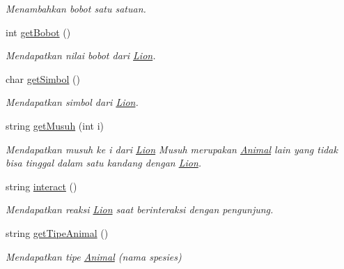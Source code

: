 \begin{DoxyCompactItemize}
\begin{DoxyCompactList}\small\item\em Menambahkan bobot satu satuan. \end{DoxyCompactList}\item 
int \hyperlink{classLion_a039685367875d1cdf4779dce5232edec}{get\-Bobot} ()
\begin{DoxyCompactList}\small\item\em Mendapatkan nilai bobot dari \hyperlink{classLion}{Lion}. \end{DoxyCompactList}\item 
char \hyperlink{classLion_a91396289e60961249390e04bddca1f33}{get\-Simbol} ()
\begin{DoxyCompactList}\small\item\em Mendapatkan simbol dari \hyperlink{classLion}{Lion}. \end{DoxyCompactList}\item 
string \hyperlink{classLion_a6afed6b04ba30683547b43d12db22602}{get\-Musuh} (int i)
\begin{DoxyCompactList}\small\item\em Mendapatkan musuh ke i dari \hyperlink{classLion}{Lion} Musuh merupakan \hyperlink{classAnimal}{Animal} lain yang tidak bisa tinggal dalam satu kandang dengan \hyperlink{classLion}{Lion}. \end{DoxyCompactList}\item 
string \hyperlink{classLion_a5ec3e7aa8b23aabab1c83fdf9e7d0edc}{interact} ()
\begin{DoxyCompactList}\small\item\em Mendapatkan reaksi \hyperlink{classLion}{Lion} saat berinteraksi dengan pengunjung. \end{DoxyCompactList}\item 
string \hyperlink{classLion_ab84e7ce8adc60b918947a03274574274}{get\-Tipe\-Animal} ()
\begin{DoxyCompactList}\small\item\em Mendapatkan tipe \hyperlink{classAnimal}{Animal} (nama spesies) \end{DoxyCompactList}\end{DoxyCompactItemize}
